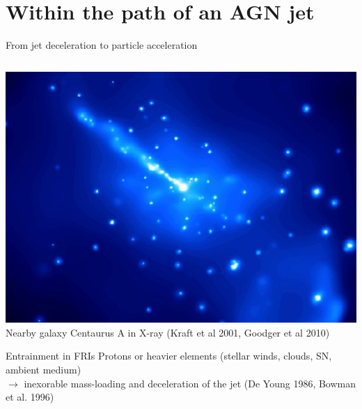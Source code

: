 \section{Within the path of an AGN jet}

\begin{frame}{From jet deceleration to particle acceleration}

		{\scriptsize
	\begin{columns}
		\begin{column}{0.5\textwidth}
			\centering
			\includegraphics[width=1.1\linewidth]{images/cena_jet.jpg}
			Nearby galaxy Centaurus A in X-ray (Kraft et al 2001, Goodger et al 2010)
				\begin{block}{Entrainment in FRIs}
				Protons or heavier elements (stellar winds, clouds, SN, ambient medium) \\
			    $\rightarrow$ inexorable mass-loading and deceleration
						of the jet (De Young 1986, Bowman et al. 1996)
			\end{block}


\end{column}
\end{columns}}
\end{frame}
